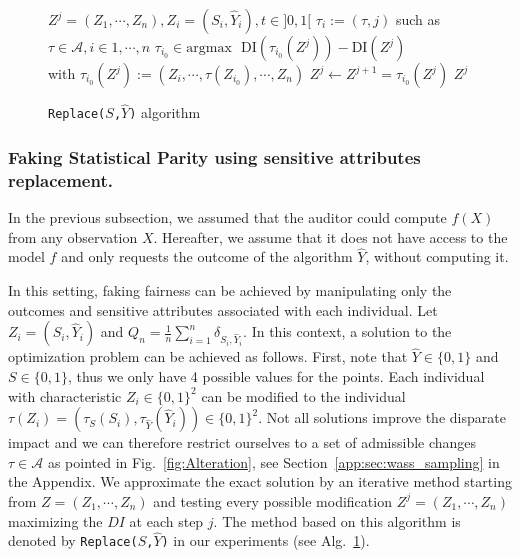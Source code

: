 \documentclass[runningheads, orivec]{llncs}
\begin{document}
\begin{figure}[t!]
\begin{minipage}{0.39\textwidth}
        \caption{Admissible modifications of $\tau : {0,1}^2 \mapsto {0,1}^2$ that increase Disparate Impact using the \texttt{Replace} method.}
        \label{fig:Alteration}
    \end{minipage}
    \hfill
\begin{minipage}{0.59\textwidth}
\centering 
\begin{algorithm}[H] 
\caption{\texttt{Replace($S$,$\widehat{Y}$)} algorithm} 
\label{alg:Replace} 
\begin{algorithmic}[1] 
\State $Z^j = (Z_1, \cdots, Z_n), Z_i = (S_i, \widehat{Y}_i), t\in ]0,1[$
\State $\tau_i := (\tau, j)$ such as $\tau \in \mathcal{A}, i\in 1, \cdots, n$ 
\State $\tau_{i_0} \in \text{argmax } \text{ DI}(\tau_{i_0}(Z^j)) - \text{DI}(Z^j)$ \\ with $\tau_{i_0}(Z^j) := (Z_i,\cdots, \tau(Z_{i_0}), \cdots, Z_n)$
\State $Z^{j} \leftarrow Z^{j+1} = \tau_{i_0}(Z^j)$
\EndWhile 
\State
\Return $Z^j$
\end{algorithmic}
\end{algorithm}
\end{minipage}
\vspace{-0.2cm}
\end{figure}
\subsubsection{Faking Statistical Parity using sensitive attributes replacement.} \label{sec:key_attr}

In the previous subsection, we assumed that the auditor could compute $f(X)$ from any observation $X$. Hereafter, we assume that it does not have access to the model $f$ and only requests the outcome of the algorithm $\widehat{Y}$, without computing it. 
 
In this setting, faking fairness can be achieved by manipulating only the outcomes and sensitive attributes associated with each individual. Let $Z_i=(S_i, \widehat{Y}_i)$ and $ Q_n=\frac{1}{n} \sum_{i=1}^n \delta_{S_i, \widehat{Y}_i}.$ In this context, a solution to the optimization problem can be achieved as follows. First, note that $\widehat{Y} \in \{ 0,1\}$ and $S \in \{ 0,1\} $, thus we only have 4 possible values for the points. Each individual with characteristic $Z_i\in \{0,1\}^2$ can be modified to the individual $\tau(Z_i)=(\tau_S(S_i),\tau_{\widehat{Y}}(\widehat{Y}_i))\in \{0,1\}^2$. Not all solutions improve the disparate impact and we can therefore restrict ourselves to a set of admissible changes $\tau \in \mathcal{A}$ as pointed in Fig.~\ref{fig:Alteration}, see Section~\ref{app:sec:wass_sampling} in the Appendix. We approximate the exact solution by an iterative method starting from $Z = (Z_1, \cdots, Z_n)$ and testing every possible modification $Z^j = (Z_1, \cdots, Z_n)$ maximizing the $DI$ at each step $j$. The method based on this algorithm is denoted by \texttt{Replace($S$,$\widehat{Y}$)} in our experiments (see Alg.~\ref{alg:Replace}). 
\end{document}
